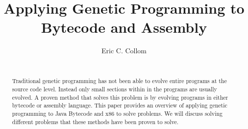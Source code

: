 \documentclass{sig-alternate}
\begin{document}
%

\title{Applying Genetic Programming to \\ Bytecode and Assembly}
%
%
%
%
%
%
\author{
%
%
\alignauthor
Eric C. Collom \\
 \\
}

\maketitle
\begin{abstract}
Traditional genetic programming has not been able to evolve entire programs at the source code level. Instead only small sections within in the programs are usually evolved. A proven method that solves this problem is by evolving programs in either bytecode or assembly language. This paper provides an overview of applying genetic programming to Java Bytecode and x86 to solve problems. We will discuss solving different problems that these methods have been proven to solve.
\end{abstract}
\end{document}
